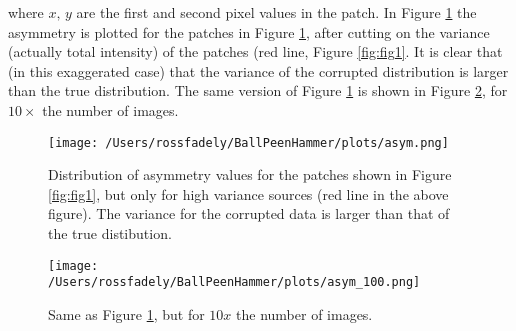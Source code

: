 \documentclass[12pt,preprint,pdftex]{aastex}
\begin{document}
\noindent where $x, \,y$ are the first and second pixel values in the patch.  In Figure \ref{fig:fig2} the asymmetry is plotted for the patches in Figure \ref{fig:fig2}, after cutting on the variance (actually total intensity) of the patches (red line, Figure \ref{fig:fig1}.  It is clear that (in this exaggerated case) that the variance of the corrupted distribution is larger than the true distribution.  The same version of Figure \ref{fig:fig2} is shown in Figure \ref{fig:fig3}, for $10\times$ the number of images.

\begin{figure}
\centering
 \texttt{[image: /Users/rossfadely/BallPeenHammer/plots/asym.png]}
\caption{Distribution of asymmetry values for the patches shown in Figure \ref{fig:fig1}, but only for high variance sources (red line in the above figure).  The variance for the corrupted data is larger than that of the true distibution.}
\label{fig:fig2}
\end{figure}

\begin{figure}
\centering
 \texttt{[image: /Users/rossfadely/BallPeenHammer/plots/asym\_100.png]}
\caption{Same as Figure \ref{fig:fig2}, but for $10x$ the number of images.}
\label{fig:fig3}
\end{figure}
\end{document}

